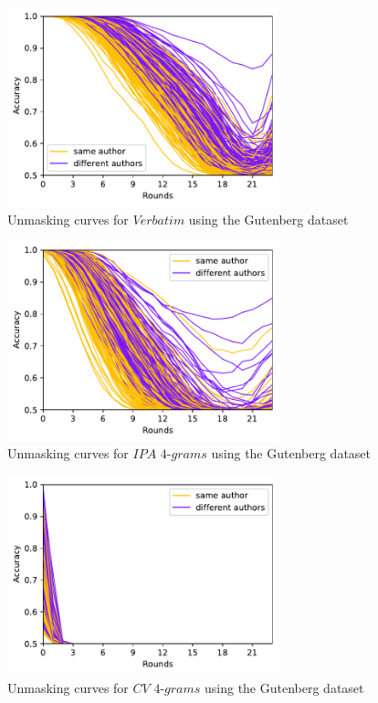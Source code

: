 \begin{figure}
  \centering
  \includegraphics[width=0.7\textwidth]{figures/verbatim_curves}
  \caption{Unmasking curves for $Verbatim$ using the Gutenberg dataset}
  \label{fig:verbatim_curves}
\end{figure}
\begin{figure}
  \centering
  \includegraphics[width=0.7\textwidth]{figures/ipa_4grams_curves}
  \caption{Unmasking curves for $IPA$ $4$-$grams$ using the Gutenberg dataset}
  \label{fig:ipa_4grams_curves}
\end{figure}
\begin{figure}
  \centering
  \includegraphics[width=0.7\textwidth]{figures/cv_4grams_curves}
  \caption{Unmasking curves for $CV$ $4$-$grams$ using the Gutenberg dataset}
  \label{fig:cv_4grams_curves}
\end{figure}
